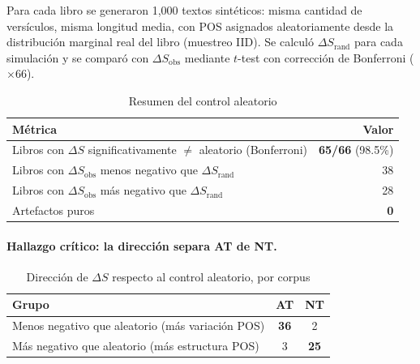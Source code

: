 \documentclass[12pt,a4paper]{article}
\newcommand{\ot}{\textcolor{otcolor}{\textbf{AT}}}
\newcommand{\nt}{\textcolor{ntcolor}{\textbf{NT}}}
\newcommand{\val}[1]{\textcolor{hlcolor}{\textbf{#1}}}
\begin{document}
Para cada libro se generaron 1,000 textos sint\'eticos: misma cantidad de vers\'iculos,
misma longitud media, con POS asignados aleatoriamente desde la distribuci\'on marginal
real del libro (muestreo IID). Se calcul\'o $\Delta S_{\text{rand}}$ para cada simulaci\'on
y se compar\'o con $\Delta S_{\text{obs}}$ mediante $t$-test con correcci\'on de Bonferroni ($\times 66$).

\begin{table}[H]
\centering
\caption{Resumen del control aleatorio}
\label{tab:randomcontrol}
\begin{tabular}{lr}
\toprule
\textbf{M\'etrica} & \textbf{Valor} \\
\midrule
Libros con $\Delta S$ significativamente $\neq$ aleatorio (Bonferroni) & \val{65/66} (98.5\%) \\
Libros con $\Delta S_{\text{obs}}$ menos negativo que $\Delta S_{\text{rand}}$ & 38 \\
Libros con $\Delta S_{\text{obs}}$ m\'as negativo que $\Delta S_{\text{rand}}$ & 28 \\
Artefactos puros & \val{0} \\
\bottomrule
\end{tabular}
\end{table}

\paragraph{Hallazgo cr\'itico: la direcci\'on separa AT de NT.}

\begin{table}[H]
\centering
\caption{Direcci\'on de $\Delta S$ respecto al control aleatorio, por corpus}
\label{tab:direction_corpus}
\begin{tabular}{lcc}
\toprule
\textbf{Grupo} & \textbf{\ot{}} & \textbf{\nt{}} \\
\midrule
Menos negativo que aleatorio (m\'as variaci\'on POS) & \val{36} & 2 \\
M\'as negativo que aleatorio (m\'as estructura POS)  & 3 & \val{25} \\
\bottomrule
\end{tabular}
\end{table}
\end{document}
